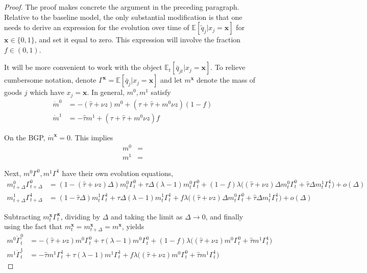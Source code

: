 \documentclass[11pt,english]{article}
\begin{document}
\begin{proof}
	The proof makes concrete the argument in the preceding paragraph. Relative to the baseline model, the only substantial modification is that one needs to derive an expression for the evolution over time of $\mathbb{E}[\tilde{q}_j | x_j = \mathbf{x}]$ for $\mathbf{x} \in \{0,1\}$, and set it equal to zero. This expression will involve the fraction $f \in (0,1)$. 
	
	It will be more convenient to work with the object $\mathbb{E}_t[\bar{q}_{jt} | x_j = \mathbf{x}]$. To relieve cumbersome notation, denote $\Gamma^{\mathbf{x}} = \mathbb{E}[\bar{q}_j | x_j = \mathbf{x}]$ and let $m^{\mathbf{x}}$ denote the mass of goods $j$ which have $x_j = \mathbf{x}$. In general, $m^0,m^1$ satisfy
	\begin{align}
		\dot{m}^0 &= -(\hat{\tau} + \nu z) m^0 + (\tau + \hat{\tau} + m^0 \nu z) (1-f)\\
		\dot{m}^1 &= -\hat{\tau} m^1 + (\tau + \hat{\tau} + m^0 \nu z) f
	\end{align}
	
	On the BGP, $\dot{m}^{\mathbf{x}} = 0$. This implies
	\begin{align}
		m^0 &= \label{appendix:model:mixedstrategyeq:m0}\\
		m^1 &= \label{appendix:model:mixedstrategyeq:m1}
	\end{align}
	
	Next, $m^0\Gamma^0,m^1\Gamma^1$ have their own evolution equations,
	\begin{align}
		m_{t+\Delta}^0\Gamma^0_{t+\Delta} &= (1 - (\hat{\tau} + \nu z) \Delta ) m^0_t  \Gamma_t^0 + \tau \Delta (\lambda - 1)m_t^0 \Gamma_t^0 + (1-f) \lambda \Big( (\hat{\tau} + \nu z) \Delta m_t^0  \Gamma_t^0 +  \hat{\tau} \Delta m_t^1  \Gamma_t^1 \Big) + o(\Delta)\\
		m_{t+\Delta}^1 \Gamma^1_{t+\Delta} &= (1 - \hat{\tau} \Delta ) m^1_t  \Gamma_t^1  + \tau \Delta (\lambda -1 ) m_t^1 \Gamma_t^1  + f \lambda \Big( (\hat{\tau} + \nu z) \Delta m_t^0  \Gamma_t^0 + \hat{\tau} \Delta m_t^1  \Gamma_t^1 \Big) + o(\Delta) 
	\end{align}
	
	Subtracting $m_t^{\mathbf{x}} \Gamma_t^{\mathbf{x}}$, dividing by $\Delta$ and taking the limit as $\Delta \to 0$, and finally using the fact that $m_t^{\mathbf{x}} = m_{t+\Delta}^{\mathbf{x}} = m^{\mathbf{x}}$, yields
	\begin{align}
		m^0 \dot{\Gamma}_t^0 &= -(\hat{\tau} + \nu z) m^0 \Gamma_t^0 + \tau (\lambda - 1) m^0 \Gamma_t^0 + (1-f)\lambda \Big( (\hat{\tau} + \nu z) m^0 \Gamma_t^0 + \hat{\tau} m^1 \Gamma_t^1 \Big) \\
		m^1 \dot{\Gamma}_t^1 &= -\hat{\tau} m^1 \Gamma_t^1 + \tau (\lambda - 1) m^1 \Gamma_t^1 + f\lambda \Big( (\hat{\tau} + \nu z) m^0 \Gamma_t^0 + \hat{\tau} m^1 \Gamma_t^1 \Big)
	\end{align}
	

\end{proof}
\end{document}
